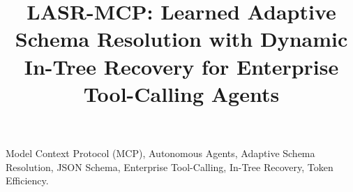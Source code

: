 \documentclass[conference,10pt,twocolumn]{IEEEtran}
\begin{document}
\title{LASR-MCP: Learned Adaptive Schema Resolution with Dynamic In-Tree Recovery for Enterprise Tool-Calling Agents}

\author{
}

\maketitle



\begin{IEEEkeywords}
Model Context Protocol (MCP), Autonomous Agents, Adaptive Schema Resolution, JSON Schema, Enterprise Tool-Calling, In-Tree Recovery, Token Efficiency.
\end{IEEEkeywords}











\end{document}
